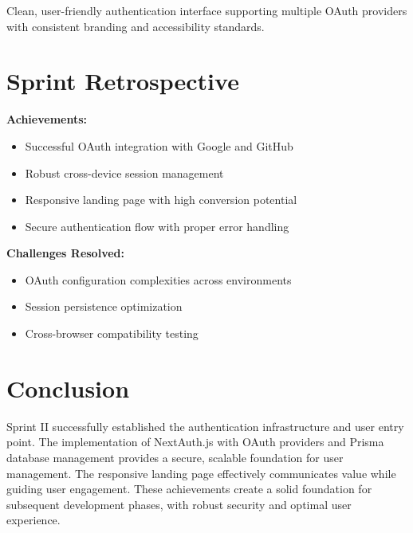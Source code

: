 Clean, user-friendly authentication interface supporting multiple OAuth providers with consistent branding and accessibility standards.

\section{Sprint Retrospective}

\textbf{Achievements:}
\begin{itemize}
    \item Successful OAuth integration with Google and GitHub
    \item Robust cross-device session management
    \item Responsive landing page with high conversion potential
    \item Secure authentication flow with proper error handling
\end{itemize}

\textbf{Challenges Resolved:}
\begin{itemize}
    \item OAuth configuration complexities across environments
    \item Session persistence optimization
    \item Cross-browser compatibility testing
\end{itemize}

\section{Conclusion}

Sprint II successfully established the authentication infrastructure and user entry point. The implementation of NextAuth.js with OAuth providers and Prisma database management provides a secure, scalable foundation for user management. The responsive landing page effectively communicates value while guiding user engagement. These achievements create a solid foundation for subsequent development phases, with robust security and optimal user experience.